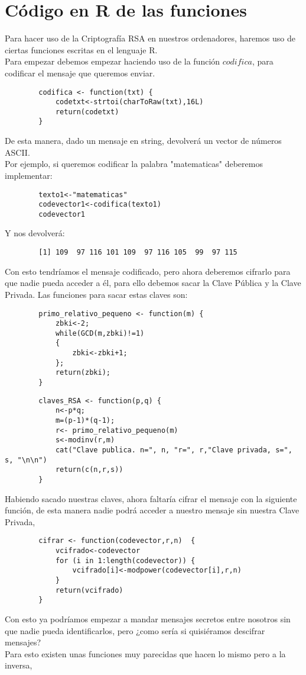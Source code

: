 \documentclass[12pt,a4paper]{book}
\theoremstyle{change}
\begin{document}
	
	\section{Código en R de las funciones}
	Para hacer uso de la Criptografía RSA en nuestros ordenadores, haremos uso de ciertas funciones escritas en el lenguaje R.\\
	Para empezar debemos empezar haciendo uso de la función $codifica$, para codificar el mensaje que queremos enviar.\\
	\begin{verbatim}
		codifica <- function(txt) {
			codetxt<-strtoi(charToRaw(txt),16L)
			return(codetxt)
		}
	\end{verbatim}
	\vspace{5mm}
	De esta manera, dado un mensaje en string, devolverá un vector de números ASCII.\\ 
	Por ejemplo, si queremos codificar la palabra "matematicas" deberemos implementar:\\
	\begin{verbatim}
		texto1<-"matematicas"
		codevector1<-codifica(texto1)
		codevector1
	\end{verbatim}
	Y nos devolverá:
	\begin{verbatim}
		[1] 109  97 116 101 109  97 116 105  99  97 115
	\end{verbatim}
	\vspace{1cm}
	Con esto tendríamos el mensaje codificado, pero ahora deberemos cifrarlo para que nadie pueda acceder a él, para ello debemos sacar la Clave Pública y la Clave Privada. Las funciones para sacar estas claves son:\\
	\begin{verbatim}
		primo_relativo_pequeno <- function(m) {
			zbki<-2;
			while(GCD(m,zbki)!=1)
			{
				zbki<-zbki+1;
			};
			return(zbki);
		}
	\end{verbatim}

	\begin{verbatim}
		claves_RSA <- function(p,q)	{
			n<-p*q;
			m=(p-1)*(q-1);
			r<- primo_relativo_pequeno(m)
			s<-modinv(r,m)
			cat("Clave publica. n=", n, "r=", r,"Clave privada, s=", s, "\n\n")
			return(c(n,r,s))
		}
	\end{verbatim}

	\vspace{1cm}
	Habiendo sacado nuestras claves, ahora faltaría cifrar el mensaje con la siguiente función, de esta manera nadie podrá acceder a nuestro mensaje sin nuestra Clave Privada,
	\begin{verbatim}
		cifrar <- function(codevector,r,n)	{
			vcifrado<-codevector
			for (i in 1:length(codevector)) {
				vcifrado[i]<-modpower(codevector[i],r,n)  
			}
			return(vcifrado)
		}
	\end{verbatim}
	Con esto ya podríamos empezar a mandar mensajes secretos entre nosotros sin que nadie pueda identificarlos, pero ¿como sería si quisiéramos descifrar mensajes?\\
	Para esto existen unas funciones muy parecidas que hacen lo mismo pero a la inversa,
	
\end{document}
